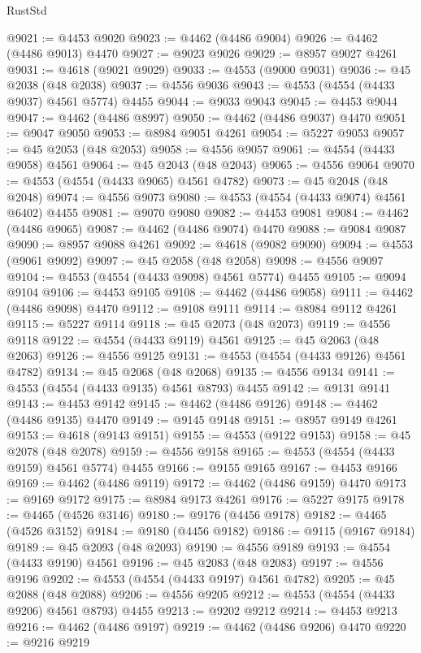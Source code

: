 \begin{lexlean}{RustStd}
\begin{coremodule}
@9021 := @4453 @9020
@9023 := @4462 (@4486 @9004)
@9026 := @4462 (@4486 @9013) @4470
@9027 := @9023 @9026
@9029 := @8957 @9027 @4261
@9031 := @4618 (@9021 @9029)
@9033 := @4553 (@9000 @9031)
@9036 := @45 @2038 (@48 @2038)
@9037 := @4556 @9036
@9043 := @4553 (@4554 (@4433 @9037) @4561 @5774) @4455
@9044 := @9033 @9043
@9045 := @4453 @9044
@9047 := @4462 (@4486 @8997)
@9050 := @4462 (@4486 @9037) @4470
@9051 := @9047 @9050
@9053 := @8984 @9051 @4261
@9054 := @5227 @9053
@9057 := @45 @2053 (@48 @2053)
@9058 := @4556 @9057
@9061 := @4554 (@4433 @9058) @4561
@9064 := @45 @2043 (@48 @2043)
@9065 := @4556 @9064
@9070 := @4553 (@4554 (@4433 @9065) @4561 @4782)
@9073 := @45 @2048 (@48 @2048)
@9074 := @4556 @9073
@9080 := @4553 (@4554 (@4433 @9074) @4561 @6402) @4455
@9081 := @9070 @9080
@9082 := @4453 @9081
@9084 := @4462 (@4486 @9065)
@9087 := @4462 (@4486 @9074) @4470
@9088 := @9084 @9087
@9090 := @8957 @9088 @4261
@9092 := @4618 (@9082 @9090)
@9094 := @4553 (@9061 @9092)
@9097 := @45 @2058 (@48 @2058)
@9098 := @4556 @9097
@9104 := @4553 (@4554 (@4433 @9098) @4561 @5774) @4455
@9105 := @9094 @9104
@9106 := @4453 @9105
@9108 := @4462 (@4486 @9058)
@9111 := @4462 (@4486 @9098) @4470
@9112 := @9108 @9111
@9114 := @8984 @9112 @4261
@9115 := @5227 @9114
@9118 := @45 @2073 (@48 @2073)
@9119 := @4556 @9118
@9122 := @4554 (@4433 @9119) @4561
@9125 := @45 @2063 (@48 @2063)
@9126 := @4556 @9125
@9131 := @4553 (@4554 (@4433 @9126) @4561 @4782)
@9134 := @45 @2068 (@48 @2068)
@9135 := @4556 @9134
@9141 := @4553 (@4554 (@4433 @9135) @4561 @8793) @4455
@9142 := @9131 @9141
@9143 := @4453 @9142
@9145 := @4462 (@4486 @9126)
@9148 := @4462 (@4486 @9135) @4470
@9149 := @9145 @9148
@9151 := @8957 @9149 @4261
@9153 := @4618 (@9143 @9151)
@9155 := @4553 (@9122 @9153)
@9158 := @45 @2078 (@48 @2078)
@9159 := @4556 @9158
@9165 := @4553 (@4554 (@4433 @9159) @4561 @5774) @4455
@9166 := @9155 @9165
@9167 := @4453 @9166
@9169 := @4462 (@4486 @9119)
@9172 := @4462 (@4486 @9159) @4470
@9173 := @9169 @9172
@9175 := @8984 @9173 @4261
@9176 := @5227 @9175
@9178 := @4465 (@4526 @3146)
@9180 := @9176 (@4456 @9178)
@9182 := @4465 (@4526 @3152)
@9184 := @9180 (@4456 @9182)
@9186 := @9115 (@9167 @9184)
@9189 := @45 @2093 (@48 @2093)
@9190 := @4556 @9189
@9193 := @4554 (@4433 @9190) @4561
@9196 := @45 @2083 (@48 @2083)
@9197 := @4556 @9196
@9202 := @4553 (@4554 (@4433 @9197) @4561 @4782)
@9205 := @45 @2088 (@48 @2088)
@9206 := @4556 @9205
@9212 := @4553 (@4554 (@4433 @9206) @4561 @8793) @4455
@9213 := @9202 @9212
@9214 := @4453 @9213
@9216 := @4462 (@4486 @9197)
@9219 := @4462 (@4486 @9206) @4470
@9220 := @9216 @9219

\end{coremodule}
\end{lexlean}
